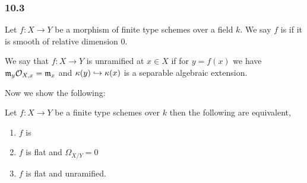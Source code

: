 \documentclass[12pt]{article}
\begin{document}
\subsubsection{10.3}

\begin{defn}
Let $f : X \to Y$ be a morphism of finite type schemes over a field $k$. We say $f$ is \etale if it is smooth of relative dimension $0$.
\end{defn}

\begin{defn}
We say that $f : X \to Y$ is unramified at $x \in X$ if for $y = f(x)$ we have $\mathfrak{m}_y \mathcal{O}_{X, x} = \mathfrak{m}_x$ and $\kappa(y) \hookrightarrow \kappa(x)$ is a separable algebraic extension.
\end{defn}

Now we show the following:

\begin{prop}
Let $f : X \to Y$ be a finite type schemes over $k$ then the following are equivalent,
\begin{enumerate}
\item $f$ is \etale
\item $f$ is flat and $\Omega_{X/Y} = 0$
\item $f$ is flat and unramified.
\end{enumerate}
\end{prop}
\end{document}
